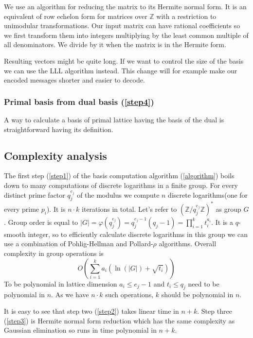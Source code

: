 \documentclass[12pt]{article}
\newcommand{\ZZ}{\mathbb{Z}}
\begin{document}
We use an algorithm for reducing the matrix to its Hermite normal form. It is an equivalent of row echelon form for matrices over $\ZZ$ with a restriction to unimodular transformations. Our input matrix can have rational coefficients so we first transform them into integers multiplying by the least common multiple of all denominators. We divide by it when the matrix is in the Hermite form.

Resulting vectors might be quite long. If we want to control the size of the basis we can use the LLL algorithm instead. This change will for example make our encoded messages shorter and easier to decode.

\subsubsection{Primal basis from dual basis (\ref{step4})}
\label{subsubsec:primal_from_dual}
A way to calculate a basis of primal lattice having the basis of the dual is straightforward having its definition.


\subsection{Complexity analysis}
\label{subsec:complexity_integers}


The first step (\ref{step1}) of the basis computation algorithm (\ref{algorithm}) boils down to many computations of discrete logarithms in a finite group. For every distinct prime factor $q_{j}^{e_{j}}$ of the modulus we compute $n$ discrete logarithms(one for every prime $p_{i}$). It is $n \cdot k$ iterations in total. Let's refer to $(\ZZ/q_{j}^{e_{j}}\ZZ)^*$ as group $G$. Group order is equal to $|G| = \varphi(q_{j}^{e_{j}}) =  q_{j}^{e_{j}-1}(q_{j}-1) = \prod_{i=1}^{k} t_{i}^{a_{i}}$.
It is a $q$-smooth integer, so to efficiently calculate discrete logarithms in this group we can use a combination of Pohlig-Hellman \cite{[PH78]} and Pollard-$\rho$ \cite{[Pol78]} algorithms. Overall complexity in group operations is
\[
    O(\sum_{i=1}^{k} a_{i}(\ln(|G|) + \sqrt{t_{i}}))
\]
To be polynomial in lattice dimension $a_{i} \leq e_{j}-1$ and $t_{i} \leq q_{j}$ need to be polynomial in $n$. As we have $n \cdot k$ such operations, $k$ should be polynomial in $n$.

It is easy to see that step two (\ref{step2}) takes linear time in $n + k$. Step three (\ref{step3}) is Hermite normal form reduction which has the same complexity as Gaussian elimination so runs in time polynomial in $n + k$.
\end{document}
